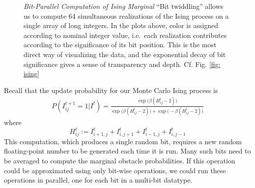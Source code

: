 \begin{figure}
\begin{tabular}{cccc}
\end{tabular}
\caption{\emph{Bit-Parallel Computation of Ising Marginal}
``Bit twiddling'' allows us to compute 64 simultaneous realizations of the Ising process
on a single array of long integers.  In the plots above, color is assigned according
to nominal integer value,
i.e.\, each realization contributes according to the significance of its bit position.
This is the most direct way of visualizing the data, and the exponential decay of bit
significance gives a sense of transparency and depth. Cf. Fig. \ref{fig: ising}
}
\end{figure}

Recall that the update probability for our Monte Carlo Ising process is
\def\bI{\bar{I}}
\def\ber{\operatorname{Bernoulli}}
\begin{align}
P(I^{t+1}_{ij} = 1|I^t) = \frac{\exp\bigl(\beta (H_{ij}^t-2)\bigr)}
{\exp\bigl(\beta (H_{ij}^t-2) \bigr) + \exp\bigl(-\beta (H_{ij}^t-2) \bigr)}
\end{align}
where
$$H_{ij}^t := I^t_{i+1,j} + I^t_{i,j+1} + I^t_{i-1,j} + I^t_{i,j-1}$$
This computation, which produces a single random bit, requires a new random floating-point number to be generated each time it is run.  
Many such bits need to be averaged to compute the marginal obstacle probabilities.
If this operation could be approximated using only bit-wise operations, we could run these operations in parallel, one for each
bit in a multi-bit datatype.  

